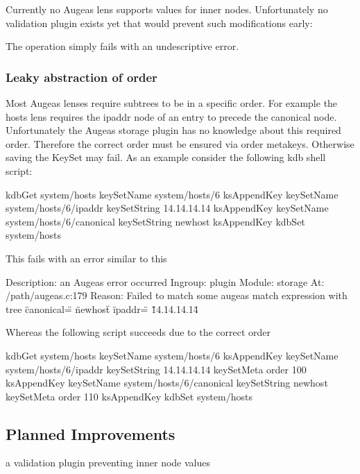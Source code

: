 Currently no Augeas lens supports values for inner nodes. Unfortunately no validation plugin exists yet that would prevent such modifications early\+: 


The operation simply fails with an undescriptive error.

\subsubsection*{Leaky abstraction of order}

Most Augeas lenses require subtrees to be in a specific order. For example the hosts lens requires the ipaddr node of an entry to precede the canonical node. Unfortunately the Augeas storage plugin has no knowledge about this required order. Therefore the correct order must be ensured via order metakeys. Otherwise saving the Key\+Set may fail. As an example consider the following kdb shell script\+: \begin{DoxyVerb}kdbGet system/hosts
keySetName system/hosts/6
ksAppendKey
keySetName system/hosts/6/ipaddr
keySetString 14.14.14.14
ksAppendKey
keySetName system/hosts/6/canonical
keySetString newhost
ksAppendKey
kdbSet system/hosts
\end{DoxyVerb}


This fails with an error similar to this \begin{DoxyVerb}Description: an Augeas error occurred
Ingroup: plugin
Module: storage
At: /path/augeas.c:179
Reason: Failed to match
some augeas match expression
with tree
{ \"canonical\" = \"newhost\" } { \"ipaddr\" = \"14.14.14.14\" }
\end{DoxyVerb}


Whereas the following script succeeds due to the correct order \begin{DoxyVerb}kdbGet system/hosts
keySetName system/hosts/6
ksAppendKey
keySetName system/hosts/6/ipaddr
keySetString 14.14.14.14
keySetMeta order 100
ksAppendKey
keySetName system/hosts/6/canonical
keySetString newhost
keySetMeta order 110
ksAppendKey
kdbSet system/hosts
\end{DoxyVerb}


\subsection*{Planned Improvements}


\begin{DoxyItemize}
\item a validation plugin preventing inner node values 
\end{DoxyItemize}
